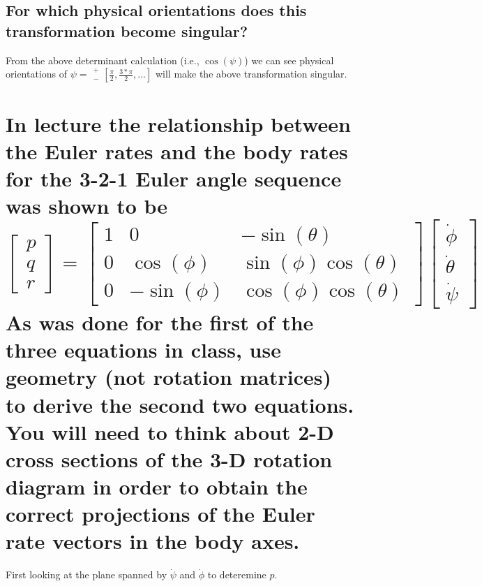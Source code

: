 \documentclass{article}
\begin{document}
\subsection{For which physical orientations does this transformation become singular?}

From the above determinant calculation (i.e., $\cos(\psi)$) we can see physical orientations of $\psi = \overset{+}{\underset{-}{\phantom{=}}}[\frac{\pi}{2}, \frac{3*\pi}{2}, ...]$ will make the above transformation singular.

\section{In lecture the relationship between the Euler rates and the body rates for the 3-2-1 Euler angle sequence was shown to be \\
$\begin{bmatrix}p \\ q \\ r\end{bmatrix} = \begin{bmatrix}1 & 0 & -\sin(\theta) \\ 0 & \cos(\phi) & \sin(\phi) \cos(\theta) \\ 0 & -\sin(\phi) & \cos(\phi) \cos(\theta) \end{bmatrix} \begin{bmatrix}\dot{\phi} \\ \dot{\theta} \\ \dot{\psi} \end{bmatrix}$ \\
As was done for the first of the three equations in class, use geometry (not rotation matrices) to derive the second two equations. You will need to think about 2-D cross sections of the 3-D rotation diagram in order to obtain the correct projections of the Euler rate vectors in the body axes.}

First looking at the plane spanned by $\dot{\psi}$ and $\dot{\phi}$ to deteremine $p$.
\end{document}
